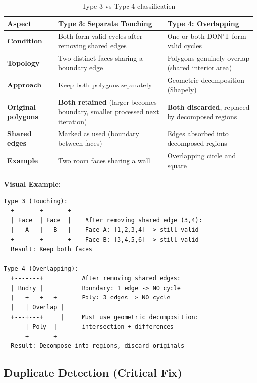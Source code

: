 \documentclass[11pt]{article}
\begin{document}
\begin{table}[h]
\centering
\begin{tabular}{|p{3cm}|p{5cm}|p{5cm}|}
\hline
\textbf{Aspect} & \textbf{Type 3: Separate Touching} & \textbf{Type 4: Overlapping} \\ \hline
\hline
\textbf{Condition} & Both form valid cycles after removing shared edges & One or both DON'T form valid cycles \\ \hline
\hline
\textbf{Topology} & Two distinct faces sharing a boundary edge & Polygons genuinely overlap (shared interior area) \\ \hline
\hline
\textbf{Approach} & Keep both polygons separately & Geometric decomposition (Shapely) \\ \hline
\hline
\textbf{Original polygons} & \textbf{Both retained} (larger becomes boundary, smaller processed next iteration) & \textbf{Both discarded}, replaced by decomposed regions \\ \hline
\hline
\textbf{Shared edges} & Marked as used (boundary between faces) & Edges absorbed into decomposed regions \\ \hline
\hline
\textbf{Example} & Two room faces sharing a wall & Overlapping circle and square \\ \hline
\end{tabular}
\caption{Type 3 vs Type 4 classification}
\end{table}

\textbf{Visual Example:}

\begin{verbatim}
Type 3 (Touching):
  +-------+-------+
  | Face  | Face  |    After removing shared edge (3,4):
  |   A   |   B   |    Face A: [1,2,3,4] -> still valid
  +-------+-------+    Face B: [3,4,5,6] -> still valid
  Result: Keep both faces

Type 4 (Overlapping):
  +-------+           After removing shared edges:
  | Bndry |           Boundary: 1 edge -> NO cycle
  |   +---+---+       Poly: 3 edges -> NO cycle
  |   | Overlap |     
  +---+---+     |     Must use geometric decomposition:
      | Poly  |       intersection + differences
      +-------+       
  Result: Decompose into regions, discard originals
\end{verbatim}

\subsection{Duplicate Detection (Critical Fix)}
\end{document}
